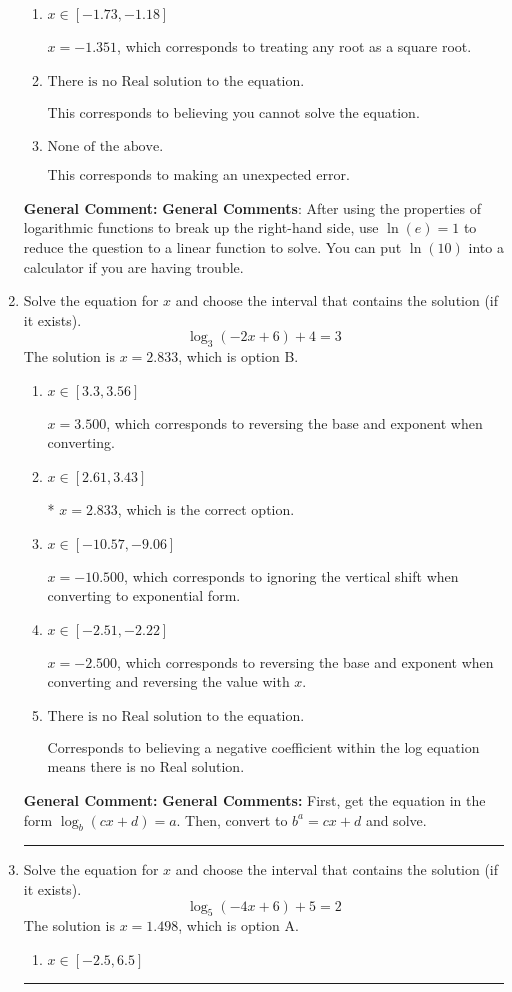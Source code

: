 \documentclass{extbook}[14pt]
\newcommand{\litem}[1]{\item #1

\rule{\textwidth}{0.4pt}}
\begin{document}
\begin{enumerate}
{\begin{enumerate}[label=\Alph*.]
* $x = -2.411$, which is the correct option.
\item \( x \in [-1.73, -1.18] \)

$x = -1.351$, which corresponds to treating any root as a square root.
\item \( \text{There is no Real solution to the equation.} \)

This corresponds to believing you cannot solve the equation.
\item \( \text{None of the above.} \)

This corresponds to making an unexpected error.
\end{enumerate}

\textbf{General Comment:} \textbf{General Comments}: After using the properties of logarithmic functions to break up the right-hand side, use $\ln(e) = 1$ to reduce the question to a linear function to solve. You can put $\ln(10)$ into a calculator if you are having trouble.
}
\litem{
Solve the equation for $x$ and choose the interval that contains the solution (if it exists).
\[ \log_{3}{(-2x+6)}+4 = 3 \]The solution is \( x = 2.833 \), which is option B.\begin{enumerate}[label=\Alph*.]
\item \( x \in [3.3, 3.56] \)

$x = 3.500$, which corresponds to reversing the base and exponent when converting.
\item \( x \in [2.61, 3.43] \)

* $x = 2.833$, which is the correct option.
\item \( x \in [-10.57, -9.06] \)

$x = -10.500$, which corresponds to ignoring the vertical shift when converting to exponential form.
\item \( x \in [-2.51, -2.22] \)

$x = -2.500$, which corresponds to reversing the base and exponent when converting and reversing the value with $x$.
\item \( \text{There is no Real solution to the equation.} \)

Corresponds to believing a negative coefficient within the log equation means there is no Real solution.
\end{enumerate}

\textbf{General Comment:} \textbf{General Comments:} First, get the equation in the form $\log_b{(cx+d)} = a$. Then, convert to $b^a = cx+d$ and solve.
}
\litem{
Solve the equation for $x$ and choose the interval that contains the solution (if it exists).
\[ \log_{5}{(-4x+6)}+5 = 2 \]The solution is \( x = 1.498 \), which is option A.\begin{enumerate}[label=\Alph*.]
\item \( x \in [-2.5, 6.5] \)


\end{enumerate}}
\end{enumerate}
\end{document}
